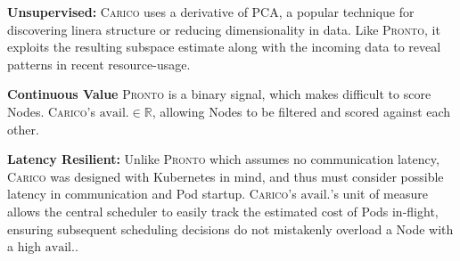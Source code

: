 \textbf{Unsupervised:} \textsc{Carico} uses a derivative of PCA, a popular technique for
discovering linera structure or reducing dimensionality in data. Like \textsc{Pronto}, it
exploits the resulting subspace estimate along with the incoming data to reveal
patterns in recent resource-usage.

\textbf{Continuous Value} \textsc{Pronto} is a binary signal, which makes difficult to
score Nodes. \textsc{Carico}'s $\text{avail.} \in \mathbb{R}$, allowing Nodes to be
filtered and scored against each other.

\textbf{Latency Resilient:} Unlike \textsc{Pronto} which assumes no communication
latency, \textsc{Carico} was designed with Kubernetes in mind, and thus must consider
possible latency in communication and Pod startup. \textsc{Carico}'s $\text{avail.}$'s
unit of measure allows the central scheduler to easily track the estimated cost
of Pods in-flight, ensuring subsequent scheduling decisions do not mistakenly
overload a Node with a high $\text{avail.}$.
%
%
%
%
